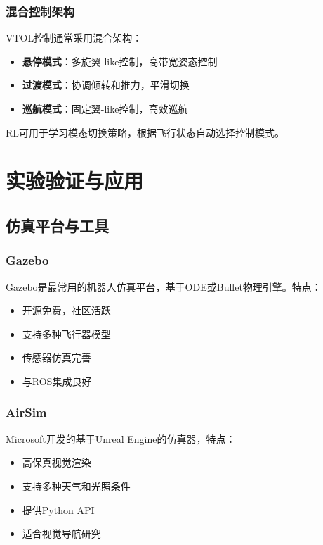 \documentclass[12pt,a4paper]{ctexart}
\begin{document}
\subsubsection{混合控制架构}

VTOL控制通常采用混合架构：
\begin{itemize}
    \item \textbf{悬停模式}：多旋翼-like控制，高带宽姿态控制
    \item \textbf{过渡模式}：协调倾转和推力，平滑切换
    \item \textbf{巡航模式}：固定翼-like控制，高效巡航
\end{itemize}

RL可用于学习模态切换策略，根据飞行状态自动选择控制模式。

\section{实验验证与应用}\label{sec:experiment}

\subsection{仿真平台与工具}

\subsubsection{Gazebo}

Gazebo是最常用的机器人仿真平台，基于ODE或Bullet物理引擎。特点：
\begin{itemize}
    \item 开源免费，社区活跃
    \item 支持多种飞行器模型
    \item 传感器仿真完善
    \item 与ROS集成良好
\end{itemize}

\subsubsection{AirSim}

Microsoft开发的基于Unreal Engine的仿真器，特点：
\begin{itemize}
    \item 高保真视觉渲染
    \item 支持多种天气和光照条件
    \item 提供Python API
    \item 适合视觉导航研究
\end{itemize}
\end{document}
